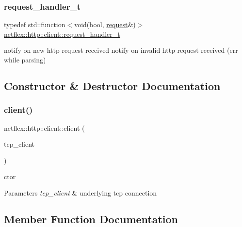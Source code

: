 \subsubsection{\texorpdfstring{request\+\_\+handler\+\_\+t}{request\_handler\_t}}
{\footnotesize\ttfamily typedef std\+::function$<$void(bool, \hyperlink{classnetflex_1_1http_1_1request}{request}\&)$>$ \hyperlink{classnetflex_1_1http_1_1client_aeac22a78222d25d3224bf50b8e44fb2d}{netflex\+::http\+::client\+::request\+\_\+handler\+\_\+t}}

notify on new http request received notify on invalid http request received (err while parsing) 

\subsection{Constructor \& Destructor Documentation}
\mbox{\label{classnetflex_1_1http_1_1client_a0b14a82f29bad24559d159f9459895a6}} 
\subsubsection{\texorpdfstring{client()}{client()}}
{\footnotesize\ttfamily netflex\+::http\+::client\+::client (\begin{DoxyParamCaption}\item[{const std\+::shared\+\_\+ptr$<$ tacopie\+::tcp\+\_\+client $>$ \&}]{tcp\+\_\+client }\end{DoxyParamCaption})\hspace{0.3cm}{\ttfamily [explicit]}}

ctor


\begin{DoxyParams}{Parameters}
{\em tcp\+\_\+client} & underlying tcp connection \\
\hline
\end{DoxyParams}


\subsection{Member Function Documentation}
\mbox{\label{classnetflex_1_1http_1_1client_a30d5d978725c09449266ea86e4dd130b}} 
